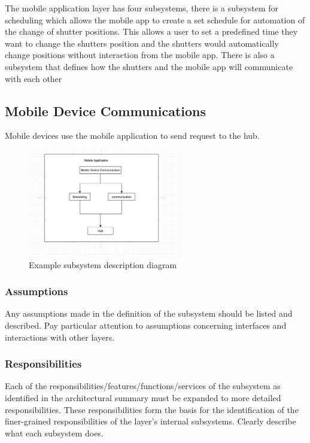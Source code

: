 The mobile application layer has four subsystems, there is a subsystem for scheduling which allows the mobile app to create a set schedule for automation of the change of shutter positions. This allows a user to set a predefined time they want to change the shutters position and the shutters would automatically change positions without interaction from the mobile app. There is also a subsystem that defines how the shutters and the mobile app will communicate with each other

\subsection{Mobile Device Communications}
Mobile devices use the mobile application to send request to the hub.

\begin{figure}[h!]
	\centering
 	\includegraphics[width=0.60\textwidth]{images/Mobile}
 \caption{Example subsystem description diagram}
\end{figure}

\subsubsection{Assumptions}
Any assumptions made in the definition of the subsystem should be listed and described. Pay particular attention to assumptions concerning interfaces and interactions with other layers.

\subsubsection{Responsibilities}
Each of the responsibilities/features/functions/services of the subsystem as identified in the architectural summary must be expanded to more detailed responsibilities. These responsibilities form the basis for the identification of the finer-grained responsibilities of the layer's internal subsystems. Clearly describe what each subsystem does.

